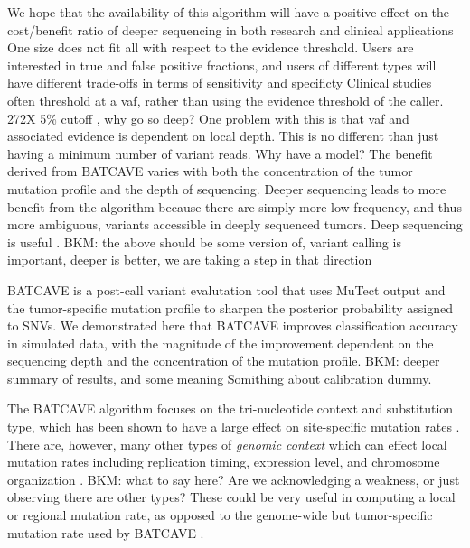 \documentclass[a4,center,fleqn]{NAR}
\newcommand{\bkmcomment}[1]{{\color{blue}BKM: #1}}
\newcommand{\batcave}{BATCAVE }
\begin{document}
We hope that the availability of this algorithm will have a positive effect on the cost/benefit ratio of deeper sequencing in both research and clinical applications
One size does not fit all with respect to the evidence threshold. Users are interested in true and false positive fractions, and users of different types will have different trade-offs in terms of sensitivity and specificty
Clinical studies often threshold at a vaf, rather than using the evidence threshold of the caller. 272X 5\% cutoff \cite{Parsons2016}, why go so deep?
One problem with this is that vaf and associated evidence is dependent on local depth. This is no different than just having a minimum number of variant reads. Why have a model?
The benefit derived from \batcave varies with both the concentration of the tumor mutation profile and the depth of sequencing.
Deeper sequencing leads to more benefit from the algorithm because there are simply more low frequency, and thus more ambiguous, variants accessible in deeply sequenced tumors.
Deep sequencing is useful \cite{Zehir2017}.
\bkmcomment{the above should be some version of, variant calling is important, deeper is better, we are taking a step in that direction}

\batcave is a post-call variant evalutation tool that uses MuTect output and the tumor-specific mutation profile to sharpen the posterior probability assigned to SNVs.
We demonstrated here that \batcave improves classification accuracy in simulated data, with the magnitude of the improvement dependent on the sequencing depth and the concentration of the mutation profile.
\bkmcomment{deeper summary of results, and some meaning Somithing about calibration dummy}.

The \batcave algorithm focuses on the tri-nucleotide context and substitution type, which has been shown to have a large effect on site-specific mutation rates \cite{Martincorena2015,Hollstein2017}.
There are, however, many other types of \textit{genomic context} which can effect local mutation rates including replication timing, expression level, and chromosome organization \cite{Buisson2019,Schuster-Bockler2012,Pleasance2010}.
\bkmcomment{what to say here? Are we acknowledging a weakness, or just observing there are other types?}
These could be very useful in computing a local or regional mutation rate, as opposed to the genome-wide but tumor-specific mutation rate used by \batcave.
\end{document}
